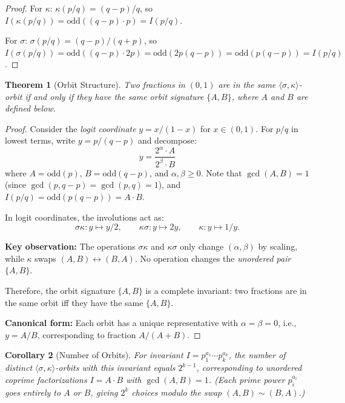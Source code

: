 \documentclass[11pt]{article}
\theoremstyle{plain}
\newtheorem{theorem}{Theorem}
\newtheorem{corollary}[theorem]{Corollary}
\theoremstyle{definition}
\theoremstyle{remark}
\begin{document}
\begin{proof}
For $\kappa$: $\kappa(p/q) = (q-p)/q$, so
$I(\kappa(p/q)) = \mathrm{odd}((q-p) \cdot p) = I(p/q)$.

For $\sigma$: $\sigma(p/q) = (q-p)/(q+p)$, so
$I(\sigma(p/q)) = \mathrm{odd}((q-p) \cdot 2p) = \mathrm{odd}(2p(q-p)) = \mathrm{odd}(p(q-p)) = I(p/q)$.
\end{proof}

\begin{theorem}[Orbit Structure]\label{thm:completeness}
Two fractions in $(0,1)$ are in the same $\langle \sigma, \kappa \rangle$-orbit
if and only if they have the same \emph{orbit signature} $\{A, B\}$, where
$A$ and $B$ are defined below.
\end{theorem}

\begin{proof}
Consider the \emph{logit coordinate} $y = x/(1-x)$ for $x \in (0,1)$.
For $p/q$ in lowest terms, write $y = p/(q-p)$ and decompose:
\[
y = \frac{2^\alpha \cdot A}{2^\beta \cdot B}
\]
where $A = \mathrm{odd}(p)$, $B = \mathrm{odd}(q-p)$, and $\alpha, \beta \geq 0$.
Note that $\gcd(A, B) = 1$ (since $\gcd(p, q-p) = \gcd(p, q) = 1$),
and $I(p/q) = \mathrm{odd}(p(q-p)) = A \cdot B$.

In logit coordinates, the involutions act as:
\[
\sigma\kappa\colon y \mapsto y/2, \qquad
\kappa\sigma\colon y \mapsto 2y, \qquad
\kappa\colon y \mapsto 1/y.
\]

\textbf{Key observation:} The operations $\sigma\kappa$ and $\kappa\sigma$ only change
$(\alpha, \beta)$ by scaling, while $\kappa$ swaps $(A, B) \leftrightarrow (B, A)$.
No operation changes the \emph{unordered pair} $\{A, B\}$.

Therefore, the orbit signature $\{A, B\}$ is a complete invariant: two fractions
are in the same orbit iff they have the same $\{A, B\}$.

\textbf{Canonical form:} Each orbit has a unique representative with $\alpha = \beta = 0$,
i.e., $y = A/B$, corresponding to fraction $A/(A+B)$.
\end{proof}

\begin{corollary}[Number of Orbits]
For invariant $I = p_1^{a_1} \cdots p_k^{a_k}$, the number of distinct
$\langle \sigma, \kappa \rangle$-orbits with this invariant equals $2^{k-1}$,
corresponding to unordered coprime factorizations $I = A \cdot B$ with $\gcd(A,B) = 1$.
(Each prime power $p_i^{a_i}$ goes entirely to $A$ or $B$, giving $2^k$ choices
modulo the swap $(A, B) \sim (B, A)$.)
\end{corollary}
\end{document}

